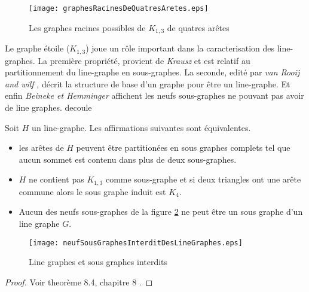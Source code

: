 \begin{figure}[htb!]\vspace{-0.5em}
	\centering
	\texttt{[image: graphesRacinesDeQuatresAretes.eps]}\vspace{-0.5em}
	\caption{ Les graphes racines possibles de $K_{1,3}$ de quatres ar\^etes   }\vspace{-0.5em}
	\label{graphesRacinesDeQuatresAretes}
\end{figure}

Le graphe \'etoile ($K_{1,3}$) joue un r\^ole important dans la caracterisation des line-graphes.
La premi\`ere propri\'et\'e, provient de {\em Krausz} \cite{krausz1943demonstration} et est relatif au partitionnement du line-graphe en sous-graphes. La seconde, edit\'e par {\em van Rooij and wilf} \cite{ROOIJetWILF1965interchange}, d\'ecrit la structure de base d'un graphe pour \^etre un line-graphe. Et enfin {\em Beineke\cite{beineke1968derived} et Hemminger}   affichent les neufs sous-graphes ne pouvant pas avoir de line graphes. decoule
\begin{theorem}
Soit $H$ un line-graphe. Les affirmations suivantes sont \'equivalentes.
\begin{itemize}
	\item les ar\^etes de $H$ peuvent \^etre partition\'ees en sous graphes complets tel que aucun sommet est contenu dans plus de deux sous-graphes.
	\item $H$ ne contient pas $K_{1,3}$ comme sous-graphe et si deux triangles ont une ar\^ete commune alors le sous graphe induit est $K_4$.
	\item Aucun des neufs sous-graphes de la figure \ref{neufSousGraphesInterditDesLineGraphes} ne peut \^etre un sous graphe d'un line graphe $G$.
\end{itemize}
\end{theorem}

\begin{figure}[htb!]\vspace{-0.5em}
	\centering
	\texttt{[image: neufSousGraphesInterditDesLineGraphes.eps]}\vspace{-0.5em}
	\caption{ Line graphes et sous graphes interdits }\vspace{-0.5em}
	\label{neufSousGraphesInterditDesLineGraphes}
\end{figure}

\begin{proof}
Voir theor\`eme 8.4, chapitre 8 \cite{lineGraphe}.
\end{proof}
